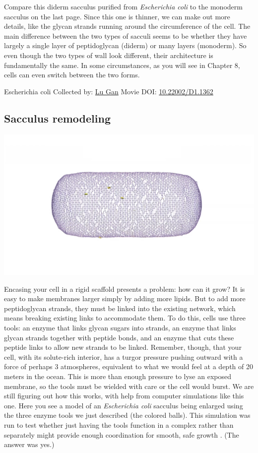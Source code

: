 \documentclass[]{tufte-book}
\begin{document}
Compare this diderm sacculus purified from \emph{Escherichia coli} to the monoderm sacculus on the last page. Since this one is thinner, we can make out more details, like the glycan strands running around the circumference of the cell. The main difference between the two types of sacculi seems to be whether they have largely a single layer of peptidoglycan (diderm) or many layers (monoderm). So even though the two types of wall look different, their architecture is fundamentally the same. In some circumstances, as you will see in Chapter 8, cells can even switch between the two forms.



\hypertarget{htmlwidget-bec17b8302e9e81ea981}{}

\label{fig:2-3a}Escherichia coli Collected by: \protect\hyperlink{lu_gan}{Lu Gan} Movie DOI: \href{https://doi.org/10.22002/D1.1362}{10.22002/D1.1362}

\hypertarget{Sacculus_remodeling}{%
\subsection{Sacculus remodeling}\label{Sacculus_remodeling}}

\includegraphics{img/schematics/2_3_2}

Encasing your cell in a rigid scaffold presents a problem: how can it grow? It is easy to make membranes larger simply by adding more lipids. But to add more peptidoglycan strands, they must be linked into the existing network, which means breaking existing links to accommodate them. To do this, cells use three tools: an enzyme that links glycan sugars into strands, an enzyme that links glycan strands together with peptide bonds, and an enzyme that cuts these peptide links to allow new strands to be linked. Remember, though, that your cell, with its solute-rich interior, has a turgor pressure pushing outward with a force of perhaps 3 atmospheres, equivalent to what we would feel at a depth of 20 meters in the ocean. This is more than enough pressure to lyse an exposed membrane, so the tools must be wielded with care or the cell would burst. We are still figuring out how this works, with help from computer simulations like this one. Here you see a model of an \emph{Escherichia coli} sacculus being enlarged using the three enzyme tools we just described (the colored balls). This simulation was run to test whether just having the tools function in a complex rather than separately might provide enough coordination for smooth, safe growth \citep{nguyen2015}. (The answer was yes.)
\end{document}
